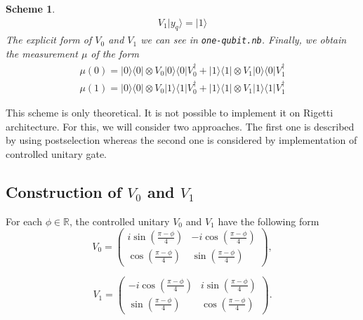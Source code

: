 \documentclass[11pt,a4paper,reqno, oneside]{amsart}
\newcommand{\R}{\ensuremath{\mathbb{R}}}
\newcommand{\ket}[1]{\ensuremath{|#1\rangle}}
\newcommand{\bra}[1]{\ensuremath{\langle#1|}}
\newcommand{\ketbra}[2]{\ensuremath{\ket{#1} \! \bra{#2}}}
\newcommand{\proj}[1]{\ensuremath{\ketbra{#1}{#1}}}
\newcommand{\1}{{\rm 1\hspace{-0.9mm}l}}
\newtheorem{scheme}{Scheme}
\begin{document}
\begin{scheme}
\begin{equation}
\begin{split}
	V_1 \ket{y_q} = \ket{1}
	\end{split}
	\end{equation}
	The explicit form of $V_0$ and $V_1$ we can see in \texttt{one-qubit.nb}.
	Finally, we obtain the measurement $\mu$ of the form
	\begin{equation}
	\begin{split}
	 \mu(0) = \proj{0} \otimes V_0 \proj{0} V_0^\dagger +  \proj{1} \otimes V_1 
	 \proj{0} V_1^\dagger  \\ 
	\mu(1) = \proj{0} \otimes V_0 \proj{1} V_0^\dagger +  \proj{1} \otimes V_1 
	\proj{1} V_1^\dagger  
	\end{split}
	\end{equation}
\end{scheme}
This scheme is only theoretical. It is not possible to implement it on Rigetti 
architecture. For this, we will consider two approaches. The first one is 
described  by using postselection whereas the second one is considered by implementation 
of controlled unitary gate. 

\subsection{Construction of $V_0$ and $V_1$}
	For each $\phi \in \R$,  the controlled unitary $V_0$ and $V_1$ have the following form
	\begin{equation}
	V_0 = \left(\begin{array}{cc}i \sin\left( \frac{\pi - \phi}{4} \right)&-i \cos\left( \frac{\pi - \phi}{4} \right)\\ \cos\left( \frac{\pi - \phi}{4}\right)& \sin\left( \frac{\pi - \phi}{4} \right)\end{array}\right),
	\end{equation}
	
		\begin{equation}
	V_1 = \left(\begin{array}{cc}-i \cos\left(\frac{\pi - \phi}{4}\right) &i \sin\left( \frac{\pi - \phi}{4}\right)\\\sin\left( \frac{\pi - \phi}{4} \right) &  \cos\left( \frac{\pi - \phi}{4} \right) \end{array}\right).
	\end{equation}
	
\end{document}
